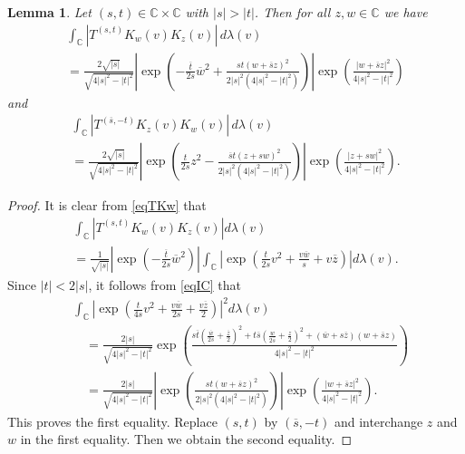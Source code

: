 \documentclass[reqno]{amsart}
\newtheorem{lemma}[theorem]{Lemma}
\newcommand{\C}{{\mathbb C}}
\newcommand{\inc}{\int_{\C}}
\begin{document}
\begin{lemma}\label{lemiTK}
Let $(s, t)\in\C\times\C$ with $|s|>|t|$. Then for all $z, w\in\C$ we have
\begin{multline*}
\inc\left|T^{(s,t)}K_w(v)K_z(v)\right|\,d\lambda(v)\\
=\frac{2\sqrt{|s|}}{\sqrt{4|s|^2-|t|^2}}
\left|\exp\left(-\frac{\overline{t}}{2s}\overline{w}^2+\frac{s{t}
\left(w+\overline{s}z\right)^{2}}{2|s|^2(4|s|^2-|t|^2)}\right)\right|
\exp\left(\frac{\left|{w}+\overline{s}{z}\right|^2}{4|s|^2-|t|^2}\right)
\end{multline*}
and
\begin{multline*}
\inc\left|{T^{(\overline{s},-t)}K_z(v)K_w(v)}\right|\,d\lambda(v)\\
=\frac{2\sqrt{|s|}}{\sqrt{4|s|^2-|t|^2} }\left|\exp\left(\frac{{t}}{2{s}}{z}^2
-\frac{\overline{s}{t}\left( z+{s}w\right)^{2}}{2|s|^2(4|s|^2-|t|^2)}\right)
\right|\exp\left(\frac{\left|{ z}+{s}{w}\right|^2}{4|s|^2-|t|^2}\right).
\end{multline*}
\end{lemma}

\begin{proof}
It is clear from \eqref{eqTKw} that
\begin{multline*}
\inc \left|T^{(s,t)}K_w(v)K_z(v)\right|d\lambda(v)\\
=\frac{1}{\sqrt{|s|}}\left|\exp\left(-\frac{\overline{t}}{2s}\overline{w}^2
\right)\right|\inc \left|\exp\left(\frac{t}{2s}v^2+\frac{ v\overline{w}}{s}
+v\overline{z}\right)\right|d\lambda(v).
\end{multline*}
Since $|t|<2|s|$, it follows from \eqref{eqIC} that
\begin{align*}
&\inc\left|\exp\left(\frac{t}{4s}v^2+\frac{ v\overline{w}}{2s}+
\frac{v\overline{z}}{2}\right)\right|^2 d\lambda(v)\\
&\quad=\frac{2|s|}{\sqrt{4|s|^2-|t|^2} }\exp \left(\frac{s\overline{t}
\left(\frac{\overline{w}}{2s}+\frac{\overline{z }}{2}\right)^{2}+
t\overline{s}\left(\frac{ w}{2\overline{s}}+\frac{z}{2}\right)^{2}+
\left(\overline{w}+s\overline{z}\right)\left({ w}+\overline{s}{z}\right)}
{4|s|^2-|t|^2}\right)\\
&\quad=\frac{2|s|}{\sqrt{4|s|^2-|t|^2}}\left|\exp\left(\frac{s{t}
\left(w+\overline{s}z\right)^{2}}{2|s|^2(4|s|^2-|t|^2)}\right)\right|
\exp\left(\frac{\left|{w}+\overline{s}{z}\right|^2}{4|s|^2-|t|^2}\right).
\end{align*}
This proves the first equality. Replace $(s,t)$ by $(\overline{s},-t)$ and 
interchange $z$ and $w$ in the first equality. Then we obtain the second 
equality.
\end{proof}
\end{document}
